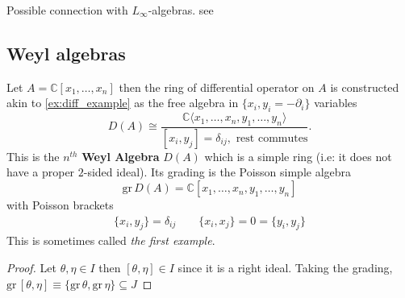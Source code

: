 Possible connection with $L_\infty$-algebras. see \citep{Braun2013}
\subsection{Weyl algebras} %
\label{sub:weyl_algebras}
Let $A = \mathbb{C}[x_1, \ldots, x_n]$ then the ring of differential operator on $A$ is constructed akin to \cref{ex:diff_example} as the free algebra in $\{x_i, y_i = - \partial_i\}$ variables
\begin{equation}
    D(A) \cong \frac{\mathbb{C} \langle x_1, \ldots, x_n, y_1, \ldots, y_n\rangle}{[x_i, y_j] = \delta_{ij}, \textrm{ rest commutes}}.
\end{equation}
This is the $n^{th}$ \textbf{Weyl Algebra} $D(A)$ which is a simple ring (i.e: it does not have a proper $2$-sided ideal).
Its grading is the Poisson simple algebra
\begin{equation}
    \mathrm{gr}\, D(A) = \mathbb{C}[x_1,\ldots,x_n,y_1,\ldots,y_n]
\end{equation}
with Poisson brackets
\begin{align}
    \{x_i,y_j\} = \delta_{ij} \qquad \{x_i,x_j\}=0=\{y_i,y_j\}
\end{align}
This is sometimes called \textit{the first example}.

\label{rem:fin_dim}

\label{prop:weyl_ideals}
\begin{proof}
    Let $\theta, \eta \in I$ then $[\theta, \eta] \in I$ since it is a right ideal.
    Taking the grading, $\mathrm{gr}\, [\theta, \eta] \equiv \{\mathrm{gr}\,\theta, \mathrm{gr}\, \eta\}\subseteq J$
\end{proof}

\label{thm:Gabber}

